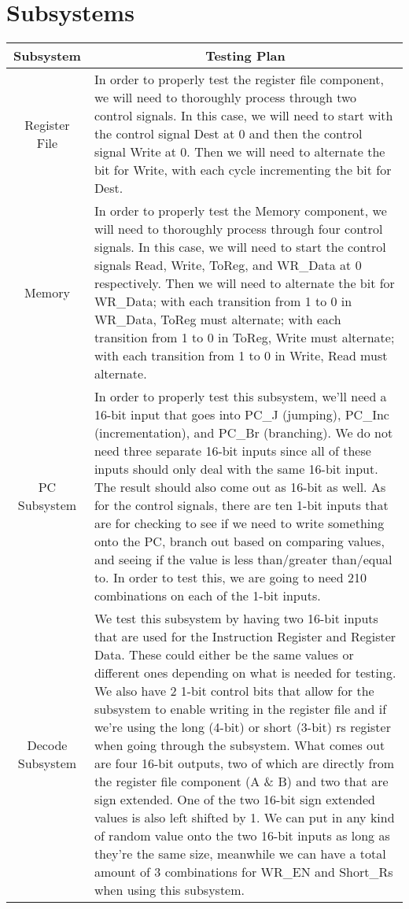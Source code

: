 \documentclass[12pt, a4paper]{report}
\begin{document}
	\pagebreak

	\section{Subsystems}
	{\renewcommand{\arraystretch}{1.5}
		\begin{longtable}[c]{c|p{11cm}}
			Subsystem & \multicolumn{1}{c}{Testing Plan} \\
			\hline
			Register File & In order to properly test the register file component, we will need to thoroughly process through two control signals.  In this case, 
			we will need to start with the control signal Dest at 0 and then the control signal Write at 0.  Then we will need to alternate the bit for Write, with 
			each cycle incrementing the bit for Dest. \\
			\hline
			Memory & In order to properly test the Memory component, we will need to thoroughly process through four control signals.  In this case, we will need to 
			start the control signals Read, Write, ToReg, and WR\_Data at 0 respectively.  Then we will need to alternate the bit for WR\_Data; with each transition from 
			1 to 0 in WR\_Data, ToReg must alternate; with each transition from 1 to 0 in ToReg, Write must alternate; with each transition from 1 to 0 in Write, Read must alternate. \\
			\hline
			PC Subsystem & In order to properly test this subsystem, we’ll need a 16-bit input that goes into PC\_J (jumping), PC\_Inc (incrementation), and PC\_Br (branching). 
			We do not need three separate 16-bit inputs since all of these inputs should only deal with the same 16-bit input. The result should also come out as 16-bit as well. 
			As for the control signals, there are ten 1-bit inputs that are for checking to see if we need to write something onto the PC, branch out based on comparing values, and 
			seeing if the value is less than/greater than/equal to. In order to test this, we are going to need 210 combinations on each of the 1-bit inputs. \\
			\hline
			Decode Subsystem & We test this subsystem by having two 16-bit inputs that are used for the Instruction Register and Register Data. These could either be the same values or different ones depending on what is needed for testing. We also have 2 1-bit control bits that allow for the subsystem to enable writing in the register file and if we’re using the long (4-bit) or short (3-bit) rs register when going through the subsystem. What comes out are four 16-bit outputs, two of which are directly from the register file component (A \& B) and two that are sign extended. One of the two 16-bit sign extended values is also left shifted by 1. We can put in any kind of random value onto the two 16-bit inputs as long as they’re the same size, meanwhile we can have a total amount of 3 combinations for WR\_EN and Short\_Rs when using this subsystem. \\
		\end{longtable}
	}
\end{document}
